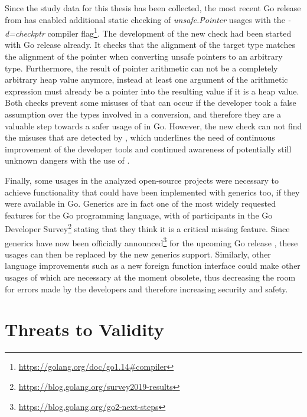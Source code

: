 Since the study data for this thesis has been collected, the most recent Go release  from
 has enabled additional static checking of \textit{unsafe.Pointer} usages with the
\textit{-d=checkptr} compiler flag\footnote{\url{https://golang.org/doc/go1.14\#compiler}}.
The development of the new check had been started with Go release  already.
It checks that the alignment of the target type matches the alignment of the pointer when converting unsafe pointers to
an arbitrary type.
Furthermore, the result of pointer arithmetic can not be a completely arbitrary heap value anymore, instead at least one
argument of the arithmetic expression must already be a pointer into the resulting value if it is a heap value.
Both checks prevent some misuses of \unsafe{} that can occur if the developer took a false assumption over the types
involved in a conversion, and therefore they are a valuable step towards a safer usage of \unsafe{} in Go.
However, the new check can not find the misuses that are detected by \toolSafer{}, which underlines the need of
continuous improvement of the developer tools and continued awareness of potentially still unknown dangers with the use
of \unsafe{}.

Finally, some \unsafe{} usages in the analyzed open-source projects were necessary to achieve functionality that could
have been implemented with generics too, if they were available in Go.
Generics are in fact one of the most widely requested features for the Go programming language, with  of
participants in the  Go Developer Survey\footnote{\url{https://blog.golang.org/survey2019-results}}
stating that they think it is a critical missing feature.
Since generics have now been officially announced\footnote{\url{https://blog.golang.org/go2-next-steps}} for the
upcoming Go release , these \unsafe{} usages can then be replaced by the new generics support.
Similarly, other language improvements such as a new foreign function interface could make other usages of \unsafe{}
which are necessary at the moment obsolete, thus decreasing the room for errors made by the developers and therefore
increasing security and safety.



\section{Threats to Validity}\label{sec:discussion:threats-to-validity}


